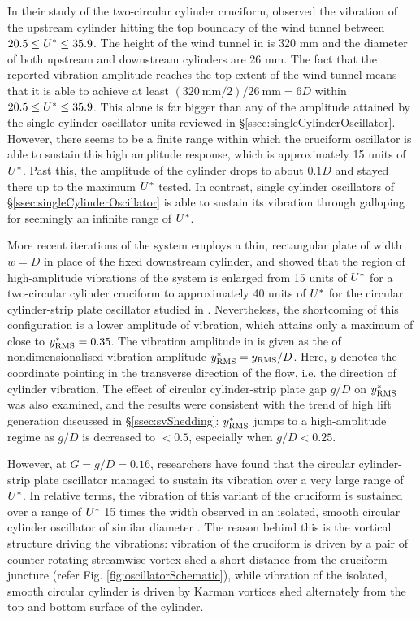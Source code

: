 \documentclass[oneside]{utmthesis}
\begin{document}
In their study of the two-circular cylinder cruciform, \citet{Shirakashi2001} observed the vibration of the upstream cylinder hitting the top boundary of the wind tunnel between $20.5 \leq U^{*} \leq 35.9$. The height of the wind tunnel in \citet{Shirakashi2001} is 320 mm and the diameter of both upstream and downstream cylinders are 26 mm. The fact that the reported vibration amplitude reaches the top extent of the wind tunnel means that it is able to achieve at least $(\SI{320}{\milli\metre}/2)/\SI{26}{\milli\metre} = 6D$ within $20.5 \leq U^{*} \leq 35.9$. This alone is far bigger than any of the amplitude attained by the single cylinder oscillator units reviewed in \S\ref{ssec:singleCylinderOscillator}. However, there seems to be a finite range within which the cruciform oscillator is able to sustain this high amplitude response, which is approximately 15 units of $U^{*}$. Past this, the amplitude of the cylinder drops to about $0.1D$ and stayed there up to the maximum $U^{*}$ tested. In contrast, single cylinder oscillators of \S\ref{ssec:singleCylinderOscillator} is able to sustain its vibration through galloping for seemingly an infinite range of $U^{*}$.

More recent iterations of the system \citep{Koide2007,Kato2007} employs a thin, rectangular plate of width $w = D$ in place of the fixed downstream cylinder, and showed that the region of high-amplitude vibrations of the system is enlarged from 15 units of $U^{*}$ for a two-circular cylinder cruciform to approximately 40 units of $U^{*}$ for the circular cylinder-strip plate oscillator studied in \citet{Koide2007}. Nevertheless, the shortcoming of this configuration is a lower amplitude of vibration, which attains only a maximum of close to $y^{*}_{\text{RMS}} = 0.35$. The vibration amplitude in \citep{Koide2007,Kato2007} is given as the \rms{} of nondimensionalised vibration amplitude $y^{*}_{\text{RMS}} = y_{\text{RMS}}/D$. Here, $y$ denotes the coordinate pointing in the transverse direction of the flow, i.e. the direction of cylinder vibration. The effect of circular cylinder-strip plate gap $g/D$ on $y^{*}_{\text{RMS}}$ was also examined, and the results were consistent with the trend of high lift generation discussed in \S\ref{ssec:svShedding}: $y^{*}_{\text{RMS}}$ jumps to a high-amplitude regime as $g/D$ is decreased to $< 0.5$, especially when $g/D < 0.25$. 

However, at $G = g/D = 0.16$, researchers have found that the circular cylinder-strip plate oscillator managed to sustain its vibration over a very large range of $U^{*}$. In relative terms, the vibration of this variant of the cruciform is sustained over a range of $U^{*}$ 15 times the width observed in an isolated, smooth circular cylinder oscillator of similar diameter \citep{Koide2009,Koide2013}. The reason behind this is the vortical structure driving the vibrations: vibration of the cruciform is driven by a pair of counter-rotating streamwise vortex shed a short distance from the cruciform juncture (refer Fig. \ref{fig:oscillatorSchematic}), while vibration of the isolated, smooth circular cylinder is driven by Karman vortices shed alternately from the top and bottom surface of the cylinder.
\end{document}

